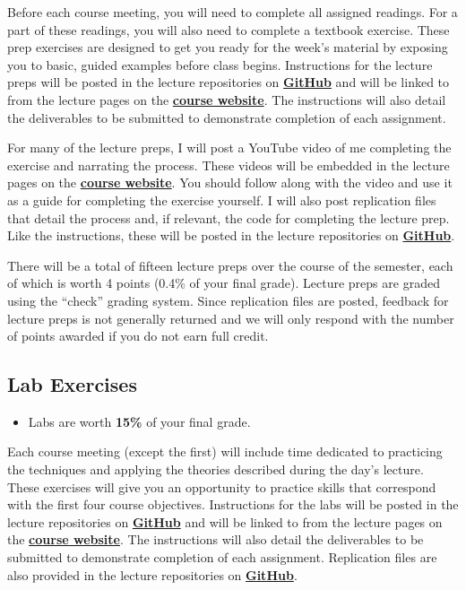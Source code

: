 \documentclass[]{book}
\newenvironment{rmdblock}[1]
  {\begin{shaded*}
  \begin{itemize}
  \renewcommand{\labelitemi}{
    \raisebox{-.7\height}[0pt][0pt]{
      {\setkeys{Gin}{width=3em,keepaspectratio}\texttt{[image: images/\#1]}}
    }
  }
  \item
  }
  {
  \end{itemize}
  \end{shaded*}
  }
\newenvironment{rmdtip}
  {\begin{rmdblock}{tip}}
  {\end{rmdblock}}
\theoremstyle{definition}
\theoremstyle{definition}
\theoremstyle{definition}
\theoremstyle{remark}
\begin{document}
Before each course meeting, you will need to complete all assigned
readings. For a part of these readings, you will also need to complete a
textbook exercise. These prep exercises are designed to get you ready
for the week's material by exposing you to basic, guided examples before
class begins. Instructions for the lecture preps will be posted in the
lecture repositories on
\href{https://github.com/slu-soc5050}{\textbf{GitHub}} and will be
linked to from the lecture pages on the
\href{https://slu-soc5050.github.io/}{\textbf{course website}}. The
instructions will also detail the deliverables to be submitted to
demonstrate completion of each assignment.

For many of the lecture preps, I will post a YouTube video of me
completing the exercise and narrating the process. These videos will be
embedded in the lecture pages on the
\href{https://slu-soc5050.github.io/}{\textbf{course website}}. You
should follow along with the video and use it as a guide for completing
the exercise yourself. I will also post replication files that detail
the process and, if relevant, the code for completing the lecture prep.
Like the instructions, these will be posted in the lecture repositories
on \href{https://github.com/slu-soc5050}{\textbf{GitHub}}.

There will be a total of fifteen lecture preps over the course of the
semester, each of which is worth 4 points (0.4\% of your final grade).
Lecture preps are graded using the ``check'' grading system. Since
replication files are posted, feedback for lecture preps is not
generally returned and we will only respond with the number of points
awarded if you do not earn full credit.

\subsection{Lab Exercises}\label{lab-exercises}

\begin{rmdtip}
Labs are worth \textbf{15\%} of your final grade.
\end{rmdtip}

Each course meeting (except the first) will include time dedicated to
practicing the techniques and applying the theories described during the
day's lecture. These exercises will give you an opportunity to practice
skills that correspond with the first four course objectives.
Instructions for the labs will be posted in the lecture repositories on
\href{https://github.com/slu-soc5050}{\textbf{GitHub}} and will be
linked to from the lecture pages on the
\href{https://slu-soc5050.github.io/}{\textbf{course website}}. The
instructions will also detail the deliverables to be submitted to
demonstrate completion of each assignment. Replication files are also
provided in the lecture repositories on
\href{https://github.com/slu-soc5050}{\textbf{GitHub}}.
\end{document}
